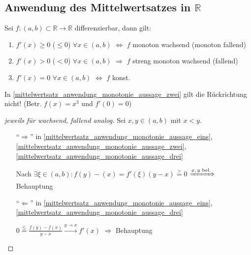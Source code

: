 \subsection{Anwendung des Mittelwertsatzes in $\mathbb{R}$}
\begin{proposition}[Monotonie]
	Sei $f:(a,b)\subset\mathbb{R}\to \mathbb{R}$ \gls{differenzierbar}, dann gilt:
	\begin{enumerate}[label={\roman*)}]
		\item {}$f'(x) \ge 0$ ($\le 0$) $\forall x\in (a,b)$ $\Leftrightarrow$ $f$ monoton wachsend (monoton fallend)
		\item {} 	$f'(x) > 0$ ($< 0$) $\forall x\in (a,b)$ $\Rightarrow$ $f$ streng monoton wachsend (fallend)
		\item {} $f'(x) = 0$ $\forall x\in (a,b)$ $\Leftrightarrow$ $f$ konst.
	\end{enumerate}
\end{proposition}

\begin{remark}
	In \ref{mittelwertsatz_anwendung_monotonie_aussage_zwei} gilt die Rückrichtung nicht! (Betr. $f(x) = x^3$ und $f'(0) = 0$)
\end{remark}

\begin{proof}[jeweils für wachsend, fallend analog]
	Sei $x,y\in (a,b)$ mit $x < y$.
	\begin{itemize}[topsep=\dimexpr -\baselineskip / 2 \relax]
		\item["`$\Rightarrow$"'] in \ref{mittelwertsatz_anwendung_monotonie_aussage_eins}, \ref{mittelwertsatz_anwendung_monotonie_aussage_zwei}, \ref{mittelwertsatz_anwendung_monotonie_aussage_drei}
		
		Nach  $\exists \xi\in(a,b): f(y) - (x) = f'(\xi) (y - x) \stackrel{>}{=} 0$ $\xRightarrow{\text{$x,y$ bel.}}$ Behauptung
		
		\item["`$\Leftarrow$"'] in \ref{mittelwertsatz_anwendung_monotonie_aussage_eins}, \ref{mittelwertsatz_anwendung_monotonie_aussage_drei}
		
		$0 \stackrel{\le}{=} \frac{f(y) - f(x)}{y - x} \xrightarrow{y\to x} f'(x)$ $\Rightarrow$ Behauptung
	\end{itemize}
\end{proof}

